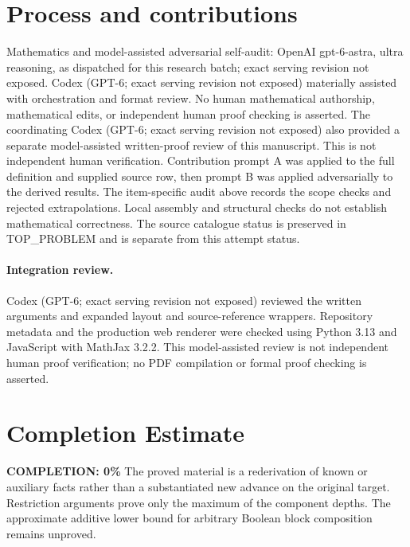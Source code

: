 \documentclass[11pt]{article}
\begin{document}
\section{Process and contributions}
Mathematics and model-assisted adversarial self-audit: OpenAI gpt-6-astra, ultra reasoning, as dispatched for this research batch; exact serving revision not exposed. Codex (GPT-6; exact serving revision not exposed) materially assisted with orchestration and format review. No human mathematical authorship, mathematical edits, or independent human proof checking is asserted.
The coordinating Codex (GPT-6; exact serving revision not exposed) also provided a separate model-assisted written-proof review of this manuscript. This is not independent human verification.
Contribution prompt A was applied to the full definition and supplied source row, then prompt B was applied adversarially to the derived results. The item-specific audit above records the scope checks and rejected extrapolations. Local assembly and structural checks do not establish mathematical correctness. The source catalogue status is preserved in TOP\_PROBLEM and is separate from this attempt status.
\paragraph{Integration review.} Codex (GPT-6; exact serving revision not exposed) reviewed the written arguments and expanded layout and source-reference wrappers. Repository metadata and the production web renderer were checked using Python 3.13 and JavaScript with MathJax 3.2.2. This model-assisted review is not independent human proof verification; no PDF compilation or formal proof checking is asserted.

\section{Completion Estimate}
\noindent\textbf{COMPLETION: 0\%}
The proved material is a rederivation of known or auxiliary facts rather than a substantiated new advance on the original target. Restriction arguments prove only the maximum of the component depths. The approximate additive lower bound for arbitrary Boolean block composition remains unproved.
\end{document}
